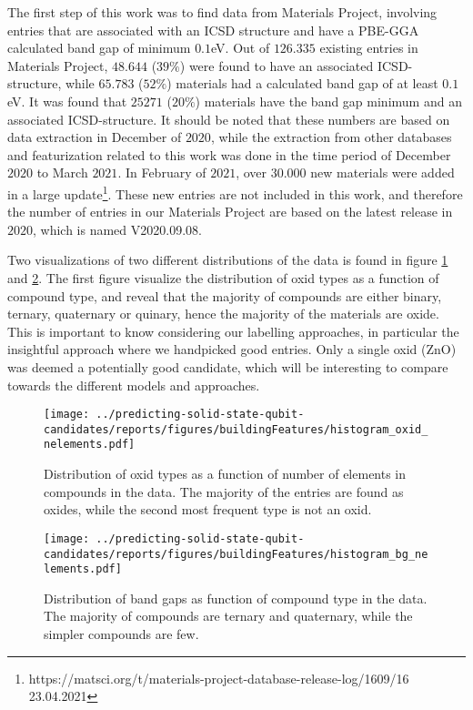 The first step of this work was to find data from Materials Project, involving entries that are associated with an ICSD structure and have a PBE-GGA calculated band gap of minimum $0.1$eV. Out of $126.335$ existing entries in Materials Project, $48.644$ ($39\%$) were found to have an associated ICSD-structure, while $65.783$ ($52\%$) materials had a calculated band gap of at least $0.1$eV. It was found that $25271$ ($20\%$) materials have the band gap minimum and an associated ICSD-structure. It should be noted that these numbers are based on data extraction in December of $2020$, while the extraction from other databases and featurization related to this work was done in the time period of December $2020$ to March $2021$. In February of $2021$, over $30.000$ new materials were added in a large update\footnote{https://matsci.org/t/materials-project-database-release-log/1609/16 23.04.2021}. These new entries are not included in this work, and therefore the number of entries in our Materials Project are based on the latest release in $2020$, which is named V2020.09.08.%

Two visualizations of two different distributions of the data is found in figure \ref{fig:hist_ox} and \ref{fig:hist_bg}. The first figure visualize the distribution of oxid types as a function of compound type, and reveal that the majority of compounds are either binary, ternary, quaternary or quinary, hence the majority of the materials are oxide. This is important to know considering our labelling approaches, in particular the insightful approach where we handpicked good entries. Only a single oxid (ZnO) was deemed a potentially good candidate, which will be interesting to compare towards the different models and approaches.

\clearpage

\begin{figure}
      \centering
      \texttt{[image: ../predicting-solid-state-qubit-candidates/reports/figures/buildingFeatures/histogram\_oxid\_nelements.pdf]}
      \vspace*{-130mm}
      \caption{Distribution of oxid types as a function of number of elements in compounds in the data. The majority of the entries are found as oxides, while the second most frequent type is not an oxid. }
      \label{fig:hist_ox}
\end{figure}

\begin{figure}
      \centering
      \texttt{[image: ../predicting-solid-state-qubit-candidates/reports/figures/buildingFeatures/histogram\_bg\_nelements.pdf]}
      \vspace*{-130mm}
      \caption{Distribution of band gaps as function of compound type in the data. The majority of compounds are ternary and quaternary, while the simpler compounds are few.}
      \label{fig:hist_bg}
\end{figure}

